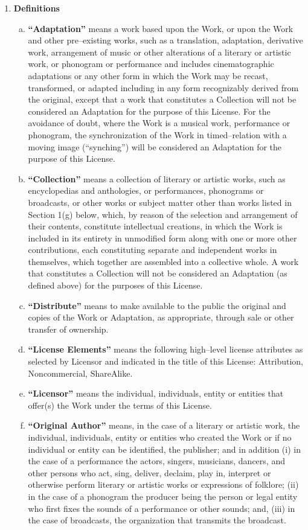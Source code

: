 \documentclass[12pt,letterpaper,oneside,final]{memoir}
\begin{document}
\begin{appendices}
\begin{enumerate}[1.]
\item \textbf{Definitions}
   \begin{enumerate}[a.]
   \item \textbf{``Adaptation''} means a work based upon the Work, or upon the Work and other pre--existing works, such as a translation, adaptation, derivative work, arrangement of music or other alterations of a literary or artistic work, or phonogram or performance and includes cinematographic adaptations or any other form in which the Work may be recast, transformed, or adapted including in any form recognizably derived from the original, except that a work that constitutes a Collection will not be considered an Adaptation for the purpose of this License. For the avoidance of doubt, where the Work is a musical work, performance or phonogram, the synchronization of the Work in timed--relation with a moving image (``synching'') will be considered an Adaptation for the purpose of this License.
   \item \textbf{``Collection''} means a collection of literary or artistic works, such as encyclopedias and anthologies, or performances, phonograms or broadcasts, or other works or subject matter other than works listed in Section 1(g) below, which, by reason of the selection and arrangement of their contents, constitute intellectual creations, in which the Work is included in its entirety in unmodified form along with one or more other contributions, each constituting separate and independent works in themselves, which together are assembled into a collective whole. A work that constitutes a Collection will not be considered an Adaptation (as defined above) for the purposes of this License.
   \item \textbf{``Distribute''} means to make available to the public the original and copies of the Work or Adaptation, as appropriate, through sale or other transfer of ownership.
   \item \textbf{``License Elements''} means the following high--level license attributes as selected by Licensor and indicated in the title of this License: Attribution, Noncommercial, ShareAlike.
   \item \textbf{``Licensor''} means the individual, individuals, entity or entities that offer(s) the Work under the terms of this License.
   \item \textbf{``Original Author''} means, in the case of a literary or artistic work, the individual, individuals, entity or entities who created the Work or if no individual or entity can be identified, the publisher; and in addition (i) in the case of a performance the actors, singers, musicians, dancers, and other persons who act, sing, deliver, declaim, play in, interpret or otherwise perform literary or artistic works or expressions of folklore; (ii) in the case of a phonogram the producer being the person or legal entity who first fixes the sounds of a performance or other sounds; and, (iii) in the case of broadcasts, the organization that transmits the broadcast.

\end{enumerate}
\end{enumerate}
\end{appendices}
\end{document}

